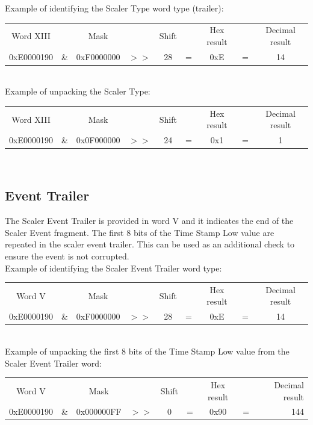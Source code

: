 \documentclass[letterpaper,12pt,notitlepage]{report}
\begin{document}
Example of identifying the Scaler Type word type (trailer):\\

\begin{tabular}{ccccccccc}
Word XIII &  & Mask & & Shift & & Hex result & & Decimal result\\
0xE0000190 & \& & 0xF0000000 & $>>$ & 28 & = & 0xE & = & 14\\
\end{tabular}\\

Example of unpacking the Scaler Type:\\

\begin{tabular}{ccccccccc}
Word XIII &  & Mask & & Shift & & Hex result & & Decimal result\\
0xE0000190 & \& & 0x0F000000 & $>>$ & 24 & = & 0x1 & = & 1\\
\end{tabular}\\


\subsection{Event Trailer}
The Scaler Event Trailer is provided in word V and it indicates the end of the Scaler Event fragment. The first 8 bits of the Time Stamp Low value are repeated in the scaler event trailer. This can be used as an additional check to ensure the event is not corrupted.\\

Example of identifying the Scaler Event Trailer word type:\\

\begin{tabular}{ccccccccc}
Word V &  & Mask & & Shift & & Hex result & & Decimal result\\
0xE0000190 & \& & 0xF0000000 & $>>$ & 28 & = & 0xE & = & 14\\
\end{tabular}\\

Example of unpacking the first 8 bits of the Time Stamp Low value from the Scaler Event Trailer word:\\

\begin{tabular}{ccccccccr}
Word V &  & Mask & & Shift & & Hex result & & Decimal result\\
0xE0000190 & \& & 0x000000FF & $>>$ & 0 & = & 0x90 & = & 144\\
\end{tabular}
\end{document}
